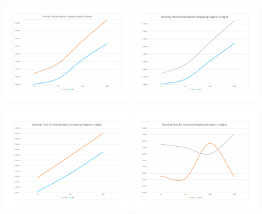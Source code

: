 \documentclass[12pt, letterpaper, titlepage, hidelinks]{article}
\begin{document}
\begin{figure}[H]
	\centering
	\includegraphics[width=0.49\textwidth]{add}
	\includegraphics[width=0.49\textwidth]{sub}
\end{figure}
\begin{figure}[H]
	\centering
	\includegraphics[width=0.49\textwidth]{mult}
	\includegraphics[width=0.49\textwidth]{comp}	
\end{figure}
\end{document}
